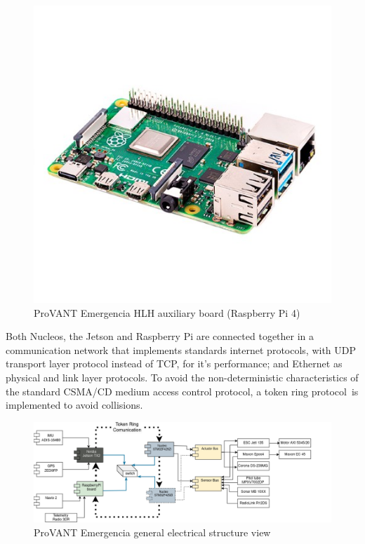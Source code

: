 \begin{figure}[htb]
	\caption{\label{fig:raspberry}ProVANT Emergencia \gls{HLH} auxiliary board (Raspberry Pi 4)}
	\begin{center}
	    \includegraphics[width=.7\linewidth,trim=.8cm 4cm .8cm 4.3cm,clip]{images/raspberry.png}
	\end{center}
\end{figure}

Both Nucleos, the Jetson and Raspberry Pi are connected together in a communication network that implements standards internet protocols, with \gls{UDP} transport layer protocol instead of \gls{TCP}, for it's performance; and Ethernet as physical and link layer protocols. To avoid the non-deterministic characteristics of the standard \gls{CSMA/CD} medium access control protocol, a token ring protocol\footnotemark\ is implemented to avoid collisions.%


\begin{figure}[htb]
	\caption{\label{fig:elecHard}ProVANT Emergencia general electrical structure view}
	\begin{center}
	    \includegraphics[width=\linewidth,trim=0cm 0cm 2.5cm 0cm,clip]{images/Hardware Setup.png}
	\end{center}
	\legend{Source: 
        Personal archive} %
\end{figure}


